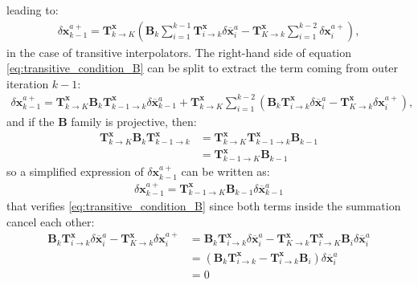 \documentclass[npg, manuscript]{copernicus}
\begin{document}
leading to:
\begin{align}
\label{eq:transitive_condition_B}
\delta \mathbf{x}^{a+}_{k-1} = \mathbf{T}^\mathbf{x}_{k \rightarrow K} \left(\mathbf{B}_k \sum_{i=1}^{k-1} \mathbf{T}^\mathbf{x}_{i \rightarrow k} \delta \overline{\mathbf{x}}^a_i - \mathbf{T}^\mathbf{x}_{K \rightarrow k} \sum_{i=1}^{k-2} \delta \mathbf{x}^{a+}_i\right),
\end{align}
in the case of transitive interpolators.
The right-hand side of equation \eqref{eq:transitive_condition_B} can be split to extract the term coming from outer iteration $k-1$:
\begin{align}
\delta \mathbf{x}^{a+}_{k-1} = \mathbf{T}^\mathbf{x}_{k \rightarrow K} \mathbf{B}_k \mathbf{T}^\mathbf{x}_{k-1 \rightarrow k} \delta \overline{\mathbf{x}}^a_{k-1} + \mathbf{T}^\mathbf{x}_{k \rightarrow K} \sum_{i=1}^{k-2} \left(\mathbf{B}_k \mathbf{T}^\mathbf{x}_{i \rightarrow k} \delta \overline{\mathbf{x}}^a_i - \mathbf{T}^\mathbf{x}_{K \rightarrow k} \delta \mathbf{x}^{a+}_i\right),
\end{align}
and if the $\mathbf{B}$ family is projective, then:
\begin{align}
\mathbf{T}^\mathbf{x}_{k \rightarrow K} \mathbf{B}_k \mathbf{T}^\mathbf{x}_{k-1 \rightarrow k} & = \mathbf{T}^\mathbf{x}_{k \rightarrow K} \mathbf{T}^\mathbf{x}_{k-1 \rightarrow k} \mathbf{B}_{k-1} \nonumber \\ 
& = \mathbf{T}^\mathbf{x}_{k-1 \rightarrow K} \mathbf{B}_{k-1}
\end{align}
so a simplified expression of $\delta \mathbf{x}^{a+}_{k-1}$ can be written as:
\begin{align}
\label{eq:projective_condition_B}
\boxed{\delta \mathbf{x}^{a+}_{k-1} = \mathbf{T}^\mathbf{x}_{k-1 \rightarrow K} \mathbf{B}_{k-1} \delta \overline{\mathbf{x}}^a_{k-1}}
\end{align}
that verifies \eqref{eq:transitive_condition_B} since both terms inside the summation cancel each other:
\begin{align}
\mathbf{B}_k \mathbf{T}^\mathbf{x}_{i \rightarrow k} \delta \overline{\mathbf{x}}^a_i - \mathbf{T}^\mathbf{x}_{K \rightarrow k} \delta \mathbf{x}^{a+}_i & = \mathbf{B}_k \mathbf{T}^\mathbf{x}_{i \rightarrow k} \delta \overline{\mathbf{x}}^a_i - \mathbf{T}^\mathbf{x}_{K \rightarrow k}  \mathbf{T}^\mathbf{x}_{i \rightarrow K} \mathbf{B}_i \delta \overline{\mathbf{x}}^a_i \nonumber \\
& = \left(\mathbf{B}_k \mathbf{T}^\mathbf{x}_{i \rightarrow k} - \mathbf{T}^\mathbf{x}_{i \rightarrow k} \mathbf{B}_i \right) \delta \overline{\mathbf{x}}^a_i \nonumber \\
& = 0
\end{align}
\end{document}
